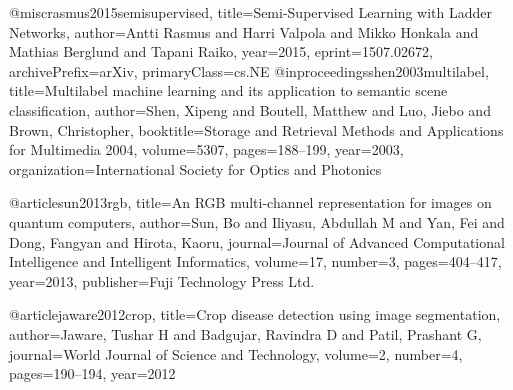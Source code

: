 @misc{rasmus2015semisupervised,
    title={Semi-Supervised Learning with Ladder Networks},
    author={Antti Rasmus and Harri Valpola and Mikko Honkala and Mathias Berglund and Tapani Raiko},
    year={2015},
    eprint={1507.02672},
    archivePrefix={arXiv},
    primaryClass={cs.NE}
}
@inproceedings{shen2003multilabel,
  title={Multilabel machine learning and its application to semantic scene classification},
  author={Shen, Xipeng and Boutell, Matthew and Luo, Jiebo and Brown, Christopher},
  booktitle={Storage and Retrieval Methods and Applications for Multimedia 2004},
  volume={5307},
  pages={188--199},
  year={2003},
  organization={International Society for Optics and Photonics}
}

@article{sun2013rgb,
  title={An RGB multi-channel representation for images on quantum computers},
  author={Sun, Bo and Iliyasu, Abdullah M and Yan, Fei and Dong, Fangyan and Hirota, Kaoru},
  journal={Journal of Advanced Computational Intelligence and Intelligent Informatics},
  volume={17},
  number={3},
  pages={404--417},
  year={2013},
  publisher={Fuji Technology Press Ltd.}
}

@article{jaware2012crop,
  title={Crop disease detection using image segmentation},
  author={Jaware, Tushar H and Badgujar, Ravindra D and Patil, Prashant G},
  journal={World Journal of Science and Technology},
  volume={2},
  number={4},
  pages={190--194},
  year={2012}
}